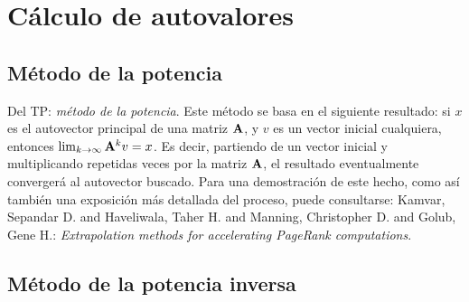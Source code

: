 
\section{Cálculo de autovalores}
\label{section:autovalores}

\subsection{Método de la potencia}

Del TP:
\emph{método de la potencia}. Este método se basa en el siguiente resultado:
si $x$ es el autovector principal de una matriz $\mathbf{A}$, y $v$ es un vector
inicial cualquiera, entonces $\lim_{k\to\infty}\mathbf{A}^k v = x$. Es decir,
partiendo de un vector inicial y multiplicando repetidas veces por la matriz
$\mathbf{A}$, el resultado eventualmente convergerá al autovector buscado. Para
una demostración de este hecho, como así también una exposición más detallada
del proceso, puede consultarse: Kamvar, Sepandar D. and Haveliwala, Taher H.
and Manning, Christopher D. and Golub, Gene H.: \emph{Extrapolation
methods for accelerating PageRank computations}.

\subsection{Método de la potencia inversa}
